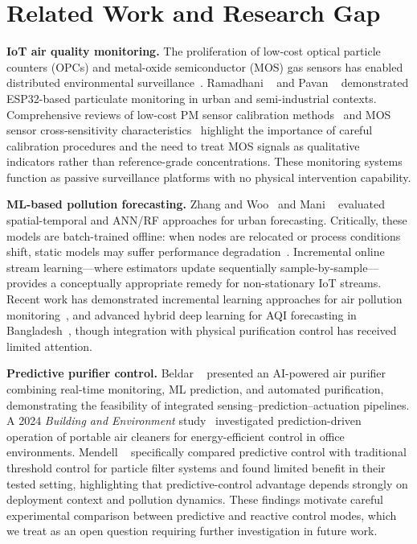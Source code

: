 
\section{Related Work and Research Gap}
\label{sec:related}

\textbf{IoT air quality monitoring.} The proliferation of low-cost optical particle counters
(OPCs) and metal-oxide semiconductor (MOS) gas sensors has enabled distributed environmental
surveillance~\citep{shabbir2025paradigm,alam2025iot}. Ramadhani \etal{}~\citep{ramadhani2025iot}
and Pavan \etal{}~\citep{pavan2025realtime} demonstrated ESP32-based particulate monitoring in
urban and semi-industrial contexts. Comprehensive reviews of low-cost PM sensor calibration
methods~\citep{lowcostpm2025acs,sensorcorrection2025npj} and MOS sensor cross-sensitivity
characteristics~\citep{mos2024trac} highlight the importance of careful calibration procedures
and the need to treat MOS signals as qualitative indicators rather than reference-grade
concentrations. These monitoring systems function as passive surveillance platforms with no
physical intervention capability.

\textbf{ML-based pollution forecasting.} Zhang and Woo~\citep{zhang2020realtime} and
Mani \etal{}~\citep{mani2021aipowered} evaluated spatial-temporal and ANN/RF approaches
for urban forecasting. Critically, these models are batch-trained offline: when nodes
are relocated or process conditions shift, static models may suffer performance
degradation~\citep{noman2025aiair}. Incremental online stream learning---where estimators
update sequentially sample-by-sample---provides a conceptually appropriate remedy for
non-stationary IoT streams. Recent work has demonstrated incremental learning approaches
for air pollution monitoring~\citep{incremental2024asc}, and advanced hybrid deep learning
for AQI forecasting in Bangladesh~\citep{bgldl2024ste}, though integration with
physical purification control has received limited attention.

\textbf{Predictive purifier control.} Beldar \etal{}~\citep{beldar2025aipurifier} presented
an AI-powered air purifier combining real-time monitoring, ML prediction, and automated
purification, demonstrating the feasibility of integrated sensing--prediction--actuation
pipelines. A 2024 \textit{Building and Environment} study~\citep{energyeff2024benv}
investigated prediction-driven operation of portable air cleaners for energy-efficient
control in office environments. Mendell \etal{}~\citep{mendell2025predictive} specifically
compared predictive control with traditional threshold control for particle filter systems
and found limited benefit in their tested setting, highlighting that predictive-control
advantage depends strongly on deployment context and pollution dynamics. These findings
motivate careful experimental comparison between predictive and reactive control modes,
which we treat as an open question requiring further investigation in future work.

